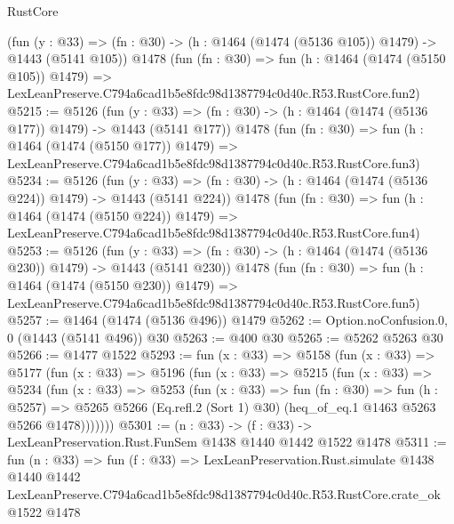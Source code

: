 \begin{lexlean}{RustCore}
\begin{coremodule}
    (fun (y : @33) => (fn : @30) -> (h : @1464 (@1474 (@5136 @105)) @1479) -> @1443 (@5141 @105))
    @1478
    (fun (fn : @30) =>
    fun (h : @1464 (@1474 (@5150 @105)) @1479) =>
    LexLeanPreserve.C794a6cad1b5e8fdc98d1387794c0d40c.R53.RustCore.fun2)
@5215 := @5126
    (fun (y : @33) => (fn : @30) -> (h : @1464 (@1474 (@5136 @177)) @1479) -> @1443 (@5141 @177))
    @1478
    (fun (fn : @30) =>
    fun (h : @1464 (@1474 (@5150 @177)) @1479) =>
    LexLeanPreserve.C794a6cad1b5e8fdc98d1387794c0d40c.R53.RustCore.fun3)
@5234 := @5126
    (fun (y : @33) => (fn : @30) -> (h : @1464 (@1474 (@5136 @224)) @1479) -> @1443 (@5141 @224))
    @1478
    (fun (fn : @30) =>
    fun (h : @1464 (@1474 (@5150 @224)) @1479) =>
    LexLeanPreserve.C794a6cad1b5e8fdc98d1387794c0d40c.R53.RustCore.fun4)
@5253 := @5126
    (fun (y : @33) => (fn : @30) -> (h : @1464 (@1474 (@5136 @230)) @1479) -> @1443 (@5141 @230))
    @1478
    (fun (fn : @30) =>
    fun (h : @1464 (@1474 (@5150 @230)) @1479) =>
    LexLeanPreserve.C794a6cad1b5e8fdc98d1387794c0d40c.R53.RustCore.fun5)
@5257 := @1464 (@1474 (@5136 @496)) @1479
@5262 := Option.noConfusion.{0, 0} (@1443 (@5141 @496)) @30
@5263 := @400 @30
@5265 := @5262 @5263 @30
@5266 := @1477 @1522
@5293 := fun (x : @33) =>
  @5158
    (fun (x : @33) =>
    @5177
      (fun (x : @33) =>
      @5196
        (fun (x : @33) =>
        @5215
          (fun (x : @33) =>
          @5234
            (fun (x : @33) =>
            @5253
              (fun (x : @33) =>
              fun (fn : @30) =>
              fun (h : @5257) =>
              @5265 @5266 (Eq.refl.{2} (Sort 1) @30) (heq_of_eq.{1} @1463 @5263 @5266 @1478)))))))
@5301 := (n : @33) -> (f : @33) -> LexLeanPreservation.Rust.FunSem @1438 @1440 @1442 @1522 @1478
@5311 := fun (n : @33) =>
  fun (f : @33) =>
  LexLeanPreservation.Rust.simulate
    @1438
    @1440
    @1442
    LexLeanPreserve.C794a6cad1b5e8fdc98d1387794c0d40c.R53.RustCore.crate_ok
    @1522
    @1478
\end{coremodule}
\end{lexlean}
